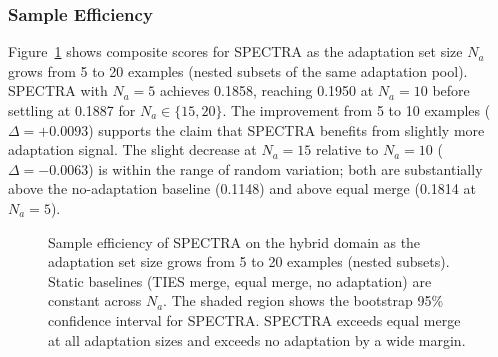 \documentclass[preprint,12pt]{elsarticle}
\begin{document}
\subsubsection{Sample Efficiency}

Figure~\ref{fig:sample_efficiency} shows composite scores for SPECTRA as the
adaptation set size $N_a$ grows from 5 to 20 examples (nested subsets of the
same adaptation pool). SPECTRA with $N_a = 5$ achieves 0.1858, reaching
0.1950 at $N_a = 10$ before settling at 0.1887 for $N_a \in \{15, 20\}$.
The improvement from 5 to 10 examples ($\Delta = +0.0093$) supports the claim
that SPECTRA benefits from slightly more adaptation signal. The slight decrease
at $N_a = 15$ relative to $N_a = 10$ ($\Delta = -0.0063$) is within the range
of random variation; both are substantially above the no-adaptation baseline
(0.1148) and above equal merge (0.1814 at $N_a = 5$).

\begin{figure}[t]
\centering
{}
\caption{Sample efficiency of SPECTRA on the hybrid domain as the adaptation
set size grows from 5 to 20 examples (nested subsets). Static baselines (TIES
merge, equal merge, no adaptation) are constant across $N_a$. The shaded region
shows the bootstrap 95\% confidence interval for SPECTRA. SPECTRA exceeds equal
merge at all adaptation sizes and exceeds no adaptation by a wide margin.}
\label{fig:sample_efficiency}
\end{figure}
\end{document}
